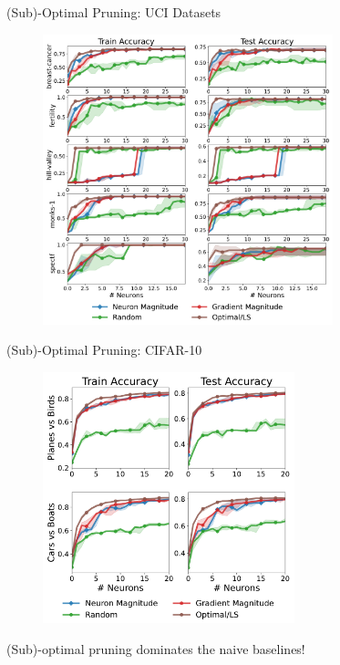 \documentclass[usenames,dvipsnames,mathserif,notheorems]{beamer}
\newcommand{\good}[1]{\textcolor{good}{#1}}
\begin{document}
\begin{frame}{(Sub)-Optimal Pruning: UCI Datasets}
	\begin{figure}[t]
		\centering
		\includegraphics[width=0.75\textwidth]{assets/uci_pruning_full_paper.pdf}
	\end{figure}
\end{frame}

\begin{frame}{(Sub)-Optimal Pruning: CIFAR-10}
	\begin{figure}[t]
		\centering
		\includegraphics[width=0.65\textwidth]{assets/prune_cifar.pdf}
	\end{figure}
	\pause
	\begin{center}
		(Sub)-optimal pruning \good{dominates} the naive baselines!
	\end{center}
\end{frame}
\end{document}
